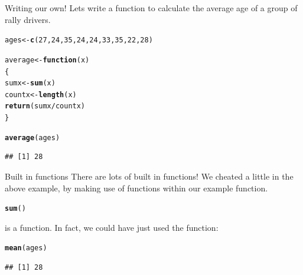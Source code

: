 \documentclass{beamer}\usepackage[]{graphicx}\usepackage[]{color}
\makeatletter
\newcommand{\hlnum}[1]{\textcolor[rgb]{0.686,0.059,0.569}{#1}}%
\newcommand{\hlopt}[1]{\textcolor[rgb]{0,0,0}{#1}}%
\newcommand{\hlstd}[1]{\textcolor[rgb]{0.345,0.345,0.345}{#1}}%
\newcommand{\hlkwa}[1]{\textcolor[rgb]{0.161,0.373,0.58}{\textbf{#1}}}%
\newcommand{\hlkwb}[1]{\textcolor[rgb]{0.69,0.353,0.396}{#1}}%
\newcommand{\hlkwc}[1]{\textcolor[rgb]{0.333,0.667,0.333}{#1}}%
\newcommand{\hlkwd}[1]{\textcolor[rgb]{0.737,0.353,0.396}{\textbf{#1}}}%
\newenvironment{kframe}{%
 \def\at@end@of@kframe{}%
 \ifinner\ifhmode%
  \def\at@end@of@kframe{\end{minipage}}%
  \begin{minipage}{\columnwidth}%
 \fi\fi%
 \def\FrameCommand##1{\hskip\@totalleftmargin \hskip-\fboxsep
 \colorbox{shadecolor}{##1}\hskip-\fboxsep
     \hskip-\linewidth \hskip-\@totalleftmargin \hskip\columnwidth}%
 \MakeFramed {\advance\hsize-\width
   \@totalleftmargin\z@ \linewidth\hsize
   \@setminipage}}%
 {\par\unskip\endMakeFramed%
 \at@end@of@kframe}
\newenvironment{knitrout}{}{} %
\makeatother
\begin{document}
\begin{frame}[fragile]{Writing our own!}
Lets write a function to calculate the average age of a group of rally drivers.
\begin{knitrout}
\color{fgcolor}\begin{kframe}
\begin{alltt}
\hlstd{ages} \hlkwb{<-} \hlkwd{c}\hlstd{(}\hlnum{27}\hlstd{,} \hlnum{24}\hlstd{,} \hlnum{35}\hlstd{,} \hlnum{24}\hlstd{,} \hlnum{24}\hlstd{,} \hlnum{33}\hlstd{,} \hlnum{35}\hlstd{,} \hlnum{22}\hlstd{,} \hlnum{28}\hlstd{)}

\hlstd{average} \hlkwb{<-} \hlkwa{function} \hlstd{(}\hlkwc{x}\hlstd{)}
\hlstd{\{}
    \hlstd{sumx} \hlkwb{<-} \hlkwd{sum}\hlstd{(x)}
    \hlstd{countx} \hlkwb{<-} \hlkwd{length}\hlstd{(x)}
    \hlkwd{return} \hlstd{(sumx} \hlopt{/} \hlstd{countx)}
\hlstd{\}}

\hlkwd{average}\hlstd{(ages)}
\end{alltt}
\begin{verbatim}
## [1] 28
\end{verbatim}
\end{kframe}
\end{knitrout}
\end{frame}


\begin{frame}[fragile]{Built in functions}
There are lots of built in functions!
\linebreak
We cheated a little in the above example, by making use of functions within our example function.
\linebreak
\linebreak
\begin{knitrout}
\color{fgcolor}\begin{kframe}
\begin{alltt}
\hlkwd{sum}\hlstd{()}
\end{alltt}
\end{kframe}
\end{knitrout}
is a function.
\linebreak
\linebreak
In fact, we could have just used the function:
\begin{knitrout}
\color{fgcolor}\begin{kframe}
\begin{alltt}
\hlkwd{mean}\hlstd{(ages)}
\end{alltt}
\begin{verbatim}
## [1] 28
\end{verbatim}
\end{kframe}
\end{knitrout}
\end{frame}
\end{document}

